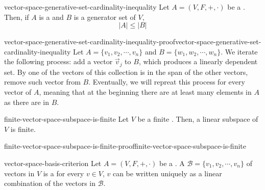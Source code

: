 \documentclass[preview]{standalone}
\begin{document}
\begin{snippettheorem}{vector-space-generative-set-cardinality-inequality}{}
    Let \(A=(V, F, +, \cdot)\) be a \vectorspace.
    Then, if \(A\) is a \linearlyindependent \set and \(B\) is a generator set of \(V\),
    \[
        |A| \leq |B|
    \]
\end{snippettheorem}

\begin{snippetproof}{vector-space-generative-set-cardinality-inequality-proof}{vector-space-generative-set-cardinality-inequality}{}
    Let \(A = \{v_1, v_2, \cdots, v_n\}\)
    and \(B = \{w_1, w_2, \cdots, w_n\}\).
    We iterate the following process:
    add a vector \(\vec{v}_j\) to \(B\), which produces a linearly dependent set.
    By 
    one of the vectors of this collection is in the span of the other vectors,
    remove such vector from \(B\). Eventually, we will repreat this process for every vector of \(A\),
    meaning that at the beginning there are at least many elements in \(A\)
    as there are in \(B\).
\end{snippetproof}

\begin{snippetcorollary}{finite-vector-space-subspace-is-finite}{}
    Let \(V\) be a finite \vectorspace. Then,
    a linear subspace of \(V\) is finite.
\end{snippetcorollary}

\begin{snippetproof}{finite-vector-space-subspace-is-finite-proof}{finite-vector-space-subspace-is-finite}{}
    \todo
\end{snippetproof}

\begin{snippetproposition}{vector-space-basis-criterion}{}
    Let \(A=(V, F, +, \cdot)\) be a \vectorspace.
    A \set \(\mathcal{B} = \{v_1, v_2, \cdots, v_n\}\)
    of vectors in \(V\) is a \basis \ifandonlyif
    for every \(v\in V\), \(v\) can be written uniquely as a linear combination of the vectors
    in \(\mathcal{B}\).
\end{snippetproposition}
\end{document}
